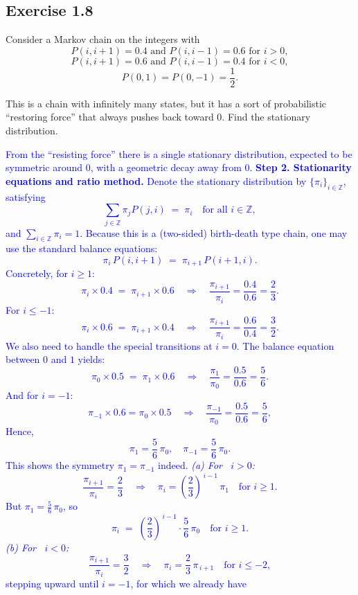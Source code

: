 \documentclass{article}
\begin{document}
    \subsection*{Exercise 1.8} Consider a Markov chain on the integers with
\[
P(i, i+1) = 0.4 \text{ and } P(i, i-1) = 0.6 \text{ for } i > 0,
\]
\[
P(i, i+1) = 0.6 \text{ and } P(i, i-1) = 0.4 \text{ for } i < 0,
\]
\[
P(0,1) = P(0,-1) = \frac{1}{2}.
\]

This is a chain with infinitely many states, but it has a sort of probabilistic ``restoring force'' that always pushes back toward 0. Find the stationary distribution.

\textcolor{blue}{From the ``resisting force'' there is a single stationary distribution, expected to be symmetric around $0$, with a geometric decay away from $0$.
\medskip
\textbf{Step 2. Stationarity equations and ratio method.}
Denote the stationary distribution by $\{\pi_i\}_{i\in\mathbb{Z}}$, satisfying
\[
\sum_{j \in \mathbb{Z}} \pi_j P(j,i) \;=\; \pi_i
\quad \text{for all } i \in \mathbb{Z},
\]
and $\sum_{i \in \mathbb{Z}} \pi_i = 1$.
Because this is a (two-sided) birth-death type chain, one may use the standard balance equations:
\[
\pi_i \, P(i, i+1) \;=\; \pi_{i+1} \, P(i+1, i).
\]
Concretely, for $i \ge 1$:
\[
\pi_i \times 0.4 \;=\; \pi_{i+1} \times 0.6
\quad \Longrightarrow \quad 
\frac{\pi_{i+1}}{\pi_i} = \frac{0.4}{0.6} = \frac{2}{3}.
\]
For $i \le -1$:
\[
\pi_i \times 0.6 \;=\; \pi_{i+1} \times 0.4
\quad \Longrightarrow \quad 
\frac{\pi_{i+1}}{\pi_i} = \frac{0.6}{0.4} = \frac{3}{2}.
\]
We also need to handle the special transitions at $i=0$. The balance equation between $0$ and $1$ yields:
\[
\pi_0 \times 0.5 \;=\; \pi_1 \times 0.6
\quad \Longrightarrow \quad
\frac{\pi_1}{\pi_0} = \frac{0.5}{0.6} = \frac{5}{6}.
\]
And for $i=-1$:
\[
\pi_{-1} \times 0.6 = \pi_0 \times 0.5
\quad \Longrightarrow \quad 
\frac{\pi_{-1}}{\pi_{0}} = \frac{0.5}{0.6} = \frac{5}{6},
\]
Hence,
\[
\pi_1 = \frac{5}{6}\,\pi_0, 
\quad
\pi_{-1} = \frac{5}{6}\,\pi_0.
\]
This shows the symmetry $\pi_1 = \pi_{-1}$ indeed.  
\medskip
\noindent
\emph{(a) For \, $i>0$:}
\[
\frac{\pi_{i+1}}{\pi_i} = \frac{2}{3} 
\quad\Longrightarrow\quad 
\pi_i = \left(\frac{2}{3}\right)^{\,i-1} \,\pi_1
\quad \text{for } i \ge 1.
\]
But $\pi_1 = \frac{5}{6}\,\pi_0$, so 
\[
\pi_i 
\;=\; 
\left(\frac{2}{3}\right)^{\,i-1} \cdot \frac{5}{6}\,\pi_0
\quad \text{for } i \ge 1.
\]
\emph{(b) For \, $i<0$:}
\[
\frac{\pi_{i+1}}{\pi_i} = \frac{3}{2} 
\quad\Longrightarrow\quad
\pi_{i} = \frac{2}{3}\,\pi_{\,i+1}
\quad \text{for } i\le -2,
\]
stepping upward until $i=-1$, for which we already have
}
\end{document}
